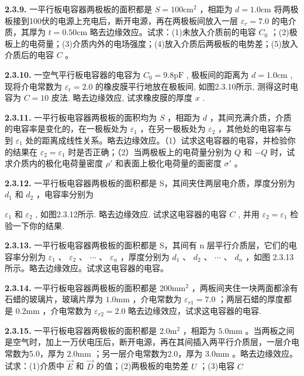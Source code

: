 \vfill
\newpage

\textbf{2.3.9.} 一平行板电容器两极板的面积都是 $S = 100\mathrm{cm}^2$ ，相距为 $d = 1.0\mathrm{cm}$ 将两极板接到100伏的电源上充电后，断开电源，再在两极板间放入一层 $\varepsilon_r = 7.0$ 的电介质，其厚为 $t = 0.50\mathrm{cm}$ 略去边缘效应。试求：(1)未放入介质前的电容 $C_0$ ；(2)极板上的电荷量；(3)介质内外的电场强度；(4)放入介质后两极板的电势差；(5)放入介质后的电容 $C$ 。

\vfill
\newpage

\textbf{2.3.10.} 一空气平行板电容器的电容为 $C_0 = 9.8\mathrm{pF}$ , 极板间的距离为 $d = 1.0\mathrm{cm}$ , 现将介电常数为 $\varepsilon_{\mathrm{r}} = 2.0$ 的橡皮膜平行地放在极板间, 如图2.3.10所示, 测得这时电容为 $C = 10$ 皮法. 略去边缘效应, 试求橡皮膜的厚度 $x$ .

\vfill
\newpage

\textbf{2.3.11.} 一平行板电容器两极板的面积均为 $S$ ，相距为 $d$ ，其间充满介质，介质的电容率是变化的，在一极板处为 $\varepsilon_1$ ，在另一极板处为 $\varepsilon_2$ ，其他处的电容率与到 $\varepsilon_1$ 处的距离成线性关系。略去边缘效应。（1）试求这电容器的电容，并检验你的结果在 $\varepsilon_2 = \varepsilon_1$ 时是否正确；（2）当两极板上的电荷量分别为 $Q$ 和 $-Q$ 时，试求介质内的极化电荷量密度 $\rho'$ 和表面上极化电荷量的面密度 $\sigma'$ 。

\vfill
\newpage

\textbf{2.3.12.} 一平行板电容器两极板的面积都是 S，其间夹住两层电介质，厚度分别为 $d_{1}$ 和 $d_{2}$ ，电容率分别为

$\varepsilon_{1}$ 和 $\varepsilon_{2}$ , 如图2.3.12所示. 略去边缘效应. 试求这电容器的电容 $C$ , 并用 $\varepsilon_{2} = \varepsilon_{1}$ 检验一下你的结果.

\vfill
\newpage

\textbf{2.3.13.} 一平行板电容器两极板的面积都是 S，其间有 n 层平行介质层，它们的电容率分别为 $\varepsilon_{1}$ 、 $\varepsilon_{2}$ 、 $\cdots$ 、 $\varepsilon_{n}$ ，厚度分别为 $d_{1}$ 、 $d_{2}$ 、 $\cdots$ 、 $d_{n}$ ，如图 2.3.13 所示。略去边缘效应。试求这电容器的电容。

\vfill
\newpage

\textbf{2.3.14.} 一平行板电容器两极板的面积都是 $200\mathrm{mm}^2$ ，两板间夹住一块两面都涂有石蜡的玻璃片，玻璃片厚为 $1.0\mathrm{mm}$ ，介电常数为 $\varepsilon_{r1} = 7.0$ ；两层石蜡的厚度都是 $0.2\mathrm{mm}$ ，介电常数为 $\varepsilon_{r2} = 2.0$ 略去边缘效应，试求这电容器的电容.

\vfill
\newpage

\textbf{2.3.15.} 一平行板电容器两极板的面积都是 $2.0\mathrm{m}^2$ ，相距为 $5.0\mathrm{mm}$ 。当两板之间是空气时，加上一万伏电压后，断开电源，再在其间插入两平行介质层，一层介电常数为5.0，厚为 $2.0\mathrm{mm}$ ；另一层介电常数为2.0，厚为 $3.0\mathrm{mm}$ 。略去边缘效应。试求：(1)介质中 $\vec{E}$ 和 $\vec{D}$ 的值；(2)两极板的电势差 $U$ ；(3)电容 $C$

